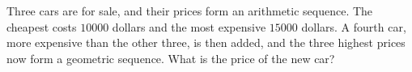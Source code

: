 Three cars are for sale, and their prices form an arithmetic sequence. The cheapest costs $10000$ dollars and the most expensive $15000$ dollars. A fourth car, more expensive than the other three, is then added, and the three highest prices now form a geometric sequence. What is the price of the new car?
